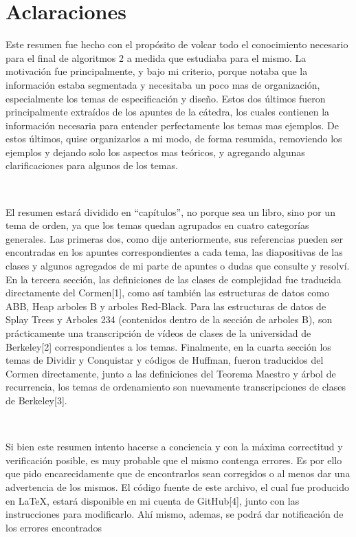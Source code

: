 \documentclass[10pt, a4paper]{report}
\begin{document}
\newpage

\chapter*{Aclaraciones}

Este resumen fue hecho con el prop\'osito de volcar todo el conocimiento necesario para el final de algoritmos 2 a medida que estudiaba para el mismo. La motivaci\'on fue principalmente, y bajo mi criterio, porque notaba que la informaci\'on estaba segmentada y necesitaba un poco mas de organizaci\'on, especialmente los temas de especificaci\'on y dise\~no. Estos dos \'ultimos fueron principalmente extra\'idos de los apuntes de la c\'atedra, los cuales contienen la informaci\'on necesaria para entender perfectamente los temas mas ejemplos. De estos \'ultimos, quise organizarlos a mi modo, de forma resumida, removiendo los ejemplos y dejando solo los aspectos mas te\'oricos, y agregando algunas clarificaciones para algunos de los temas.

~

El resumen estar\'a dividido en ``cap\'itulos'', no porque sea un libro, sino por un tema de orden, ya que los temas quedan agrupados en cuatro categor\'ias generales. Las primeras dos, como dije anteriormente, sus referencias pueden ser encontradas en los apuntes correspondientes a cada tema, las diapositivas de las clases y algunos agregados de mi parte de apuntes o dudas que consulte y resolv\'i. En la tercera secci\'on, las definiciones de las clases de complejidad fue traducida directamente del Cormen[1], como as\'i tambi\'en las estructuras de datos como ABB, Heap arboles B y arboles Red-Black. Para las estructuras de datos de Splay Trees y Arboles 234 (contenidos dentro de la secci\'on de arboles B), son pr\'acticamente una transcripci\'on de v\'ideos de clases de la universidad de Berkeley[2] correspondientes a los temas. Finalmente, en la cuarta secci\'on los temas de Dividir y Conquistar y c\'odigos de Huffman, fueron traducidos del Cormen directamente, junto a las definiciones del Teorema Maestro y \'arbol de recurrencia, los temas de ordenamiento son nuevamente transcripciones de clases de Berkeley[3].

~

Si bien este resumen intento hacerse a conciencia y con la m\'axima correctitud y verificaci\'on posible, es muy probable que el mismo contenga errores. Es por ello que pido encarecidamente que de encontrarlos sean corregidos o al menos dar una advertencia de los mismos. El c\'odigo fuente de este archivo, el cual fue producido en LaTeX, estar\'a disponible en mi cuenta de GitHub[4], junto con las instrucciones para modificarlo. Ah\'i mismo, ademas, se podr\'a dar notificaci\'on de los errores encontrados
\end{document}
